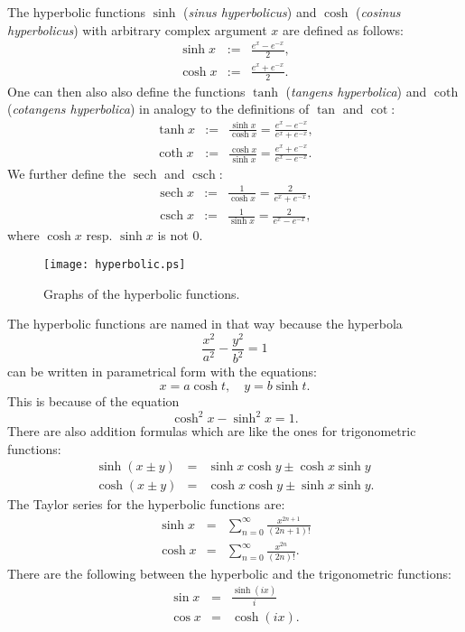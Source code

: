\documentclass[12pt]{article}
\newcommand{\sech}{\operatorname{sech}}
\newcommand{\csch}{\operatorname{csch}}
\begin{document}
The hyperbolic functions $\sinh$ ({\em sinus hyperbolicus}) and $\cosh$ ({\em cosinus hyperbolicus}) with arbitrary complex argument $x$ are defined as follows:
\begin{eqnarray*}
\sinh x&:=&\frac{e^x-e^{-x}}{2},\\
\cosh x&:=&\frac{e^x+e^{-x}}{2}.
\end{eqnarray*}
One can then also also define the functions $\tanh$ ({\em tangens hyperbolica}) and $\coth$ ({\em cotangens hyperbolica}) in analogy to the definitions of $\tan$ and $\cot$:
\begin{eqnarray*}
\tanh x&:=&\frac{\sinh x}{\cosh x}=\frac{e^x-e^{-x}}{e^x+e^{-x}},\\
\coth x&:=&\frac{\cosh x}{\sinh x}=\frac{e^x+e^{-x}}{e^x-e^{-x}}.
\end{eqnarray*}
We further define the $\sech$ and $\csch$:
\begin{eqnarray*}
\sech x&:=&\frac{1}{\cosh x}=\frac{2}{e^x+e^{-x}},\\
\csch x&:=&\frac{1}{\sinh x}=\frac{2}{e^x-e^{-x}},
\end{eqnarray*}
where $\cosh x$ resp. $\sinh x$ is not $0$.

\begin{figure}[h]
\begin{centering}
\texttt{[image: hyperbolic.ps]}
\caption{Graphs of the hyperbolic functions.}\label{fig:graphs}
\end{centering}
\end{figure}

The hyperbolic functions are named in that way because the hyperbola
$$\frac{x^2}{a^2}-\frac{y^2}{b^2}=1$$
can be written in parametrical form with the equations:
$$x=a\cosh t,\quad y=b\sinh t.$$
This is because of the equation
$$\cosh^2 x-\sinh^2 x=1.$$
There are also addition formulas which are like the ones for trigonometric functions:
\begin{eqnarray*}
\sinh (x\pm y)&=&\sinh x\cosh y\pm\cosh x\sinh y\\
\cosh (x\pm y)&=&\cosh x\cosh y\pm\sinh x\sinh y.
\end{eqnarray*}
The Taylor series for the hyperbolic functions are:
\begin{eqnarray*}
\sinh x&=&\sum_{n=0}^{\infty}\frac{x^{2n+1}}{(2n+1)!}\\
\cosh x&=&\sum_{n=0}^{\infty}\frac{x^{2n}}{(2n)!}.
\end{eqnarray*}
There are  the following  between the hyperbolic and the trigonometric functions:
\begin{eqnarray*}
\sin x&=&\frac{\sinh (ix)}{i}\\
\cos x&=&\cosh (ix).
\end{eqnarray*}

\end{document}
